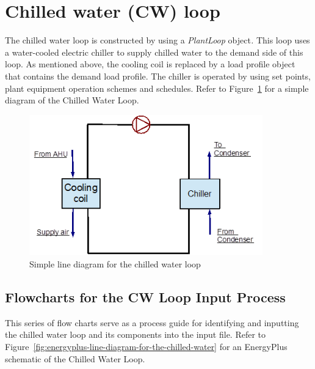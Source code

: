 \section{Chilled water (CW) loop}\label{chilled-water-cw-loop}

The chilled water loop is constructed by using a \emph{PlantLoop} object\emph{.} This loop uses a water-cooled electric chiller to supply chilled water to the demand side of this loop. As mentioned above, the cooling coil is replaced by a load profile object that contains the demand load profile. The chiller is operated by using set points, plant equipment operation schemes and schedules. Refer to Figure~\ref{fig:simple-line-diagram-for-the-chilled-water} for a simple diagram of the Chilled Water Loop.

\begin{figure}[hbtp] %
\centering
\includegraphics[width=0.9\textwidth, height=0.9\textheight, keepaspectratio=true]{media/image015.png}
\caption{Simple line diagram for the chilled water loop \protect \label{fig:simple-line-diagram-for-the-chilled-water}}
\end{figure}

\subsection{Flowcharts for the CW Loop Input Process}\label{flowcharts-for-the-cw-loop-input-process}

This series of flow charts serve as a process guide for identifying and inputting the chilled water loop and its components into the input file. Refer to Figure~\ref{fig:energyplus-line-diagram-for-the-chilled-water} for an EnergyPlus schematic of the Chilled Water Loop.

